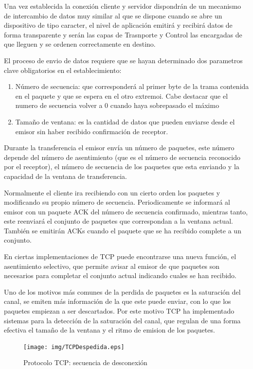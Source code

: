 \documentclass[a4paper,spanish,12pt]{book}
\begin{document}
Una vez establecida la conexión cliente y servidor dispondrán de un mecanismo de intercambio de datos muy similar al que se dispone cuando se abre un dispositivo de tipo caracter, el nivel de aplicación emitirá y recibirá datos de forma transparente y serán las capas de Trasnporte y Control las encargadas de que lleguen y se ordenen correctamente en destino.


El proceso de envio de datos requiere que se hayan determinado dos parametros clave obligatorios en el establecimiento:
\begin{enumerate}
	\item{Número de secuencia: que corresponderá al primer byte de la trama contenida en el paquete y que se espera en el otro extremoi. Cabe destacar que el numero de secuencia volver a 0 cuando haya sobrepasado el máximo}
	\item{Tamaño de ventana: es la cantidad de datos que pueden enviarse desde el emisor sin haber recibido confirmación de receptor.}
\end{enumerate}

Durante la transferencia el emisor envía un número de paquetes, este número depende del número de asentimiento (que es el número de secuencia reconocido por el receptor), el número de secuencia de los paquetes que esta enviando y la capacidad de la ventana de transferencia.

Normalmente el cliente ira recibiendo con un cierto orden los paquetes y modificando su propio número de secuencia. Periodicamente se informará al emisor con un paquete ACK del número de secuencia confirmado, mientras tanto, este reenviará el conjunto de paquetes que correspondan a la ventana actual. Tambi\'en se emitirán ACKs cuando el paquete que se ha recibido complete a un conjunto.

En ciertas implementaciones de TCP puede encontrarse una nueva función, el asentimiento selectivo, que permite avisar al emisor de que paquetes son necesarios para completar el conjunto actual indicando cuales se han recibido.

Uno de los motivos más comunes de la perdida de paquetes es la saturación del canal, se emiten más información de la que este puede enviar, con lo que los paquetes empiezan a ser descartados. Por este motivo TCP ha implementado sistemas para la detección de la saturación del canal, que regulan de una forma efectiva el tamaño de la ventana y el ritmo de emision de los paquetes.

\begin{figure}
	\texttt{[image: img/TCPDespedida.eps]}	
              \caption{Protocolo TCP: secuencia de desconexión}
  \label{fig:TCPDespedida}
\end{figure}
\end{document}
